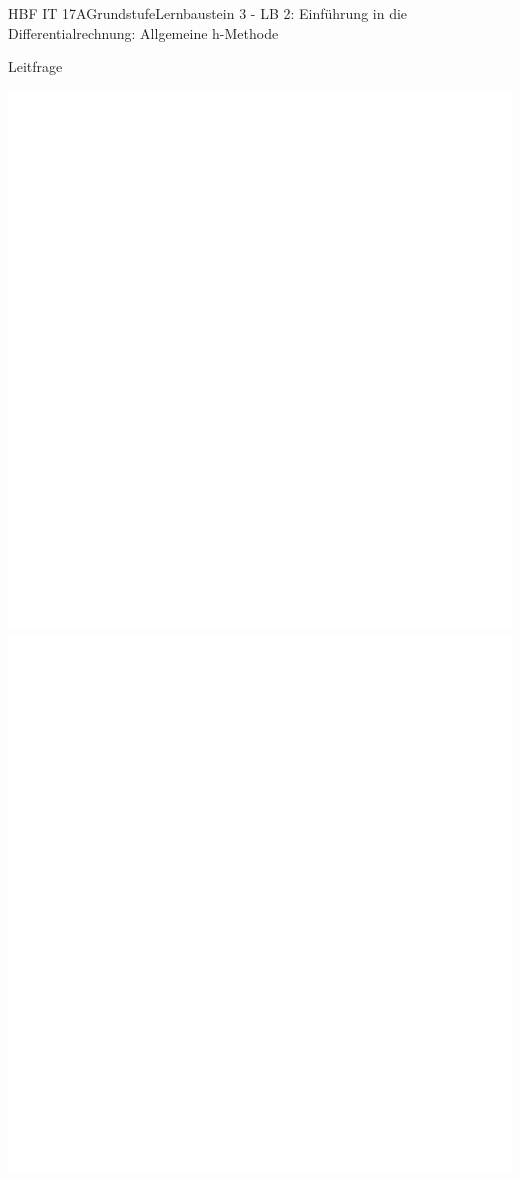 \documentclass[oneside,openany,headings=optiontotoc,11pt,numbers=noenddot]{scrreprt}
\begin{document}
\begin{worksheet}{HBF IT 17A}{Grundstufe}{Lernbaustein 3 - LB 2: Einführung in die Differentialrechnung: Allgemeine h-Methode}
		\begin{framed}
			\noindent
			\tiny{\color{codegray}Leitfrage}\\
		\end{framed}
		
		\begin{framed}
			\includegraphics[scale=0.85]{../empty.jpg}\\
			\includegraphics[scale=1.1]{../empty.jpg}
		\end{framed}
	

\end{worksheet}
\end{document}
